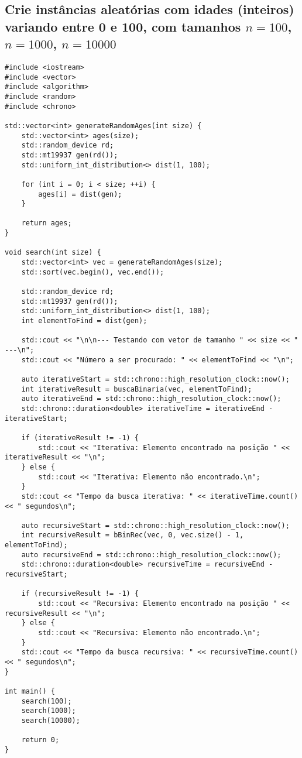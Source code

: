\subsection{Crie instâncias aleatórias com idades (inteiros) variando entre 0 e 100, com tamanhos \( n = 100 \), \( n = 1000 \), \( n = 10000 \)}

\begin{verbatim}
#include <iostream>
#include <vector>
#include <algorithm>
#include <random>
#include <chrono>

std::vector<int> generateRandomAges(int size) {
    std::vector<int> ages(size);
    std::random_device rd;
    std::mt19937 gen(rd());
    std::uniform_int_distribution<> dist(1, 100);

    for (int i = 0; i < size; ++i) {
        ages[i] = dist(gen);
    }

    return ages;
}

void search(int size) {
    std::vector<int> vec = generateRandomAges(size);
    std::sort(vec.begin(), vec.end());

    std::random_device rd;
    std::mt19937 gen(rd());
    std::uniform_int_distribution<> dist(1, 100);
    int elementToFind = dist(gen);

    std::cout << "\n\n--- Testando com vetor de tamanho " << size << " ---\n";
    std::cout << "Número a ser procurado: " << elementToFind << "\n";

    auto iterativeStart = std::chrono::high_resolution_clock::now();
    int iterativeResult = buscaBinaria(vec, elementToFind);
    auto iterativeEnd = std::chrono::high_resolution_clock::now();
    std::chrono::duration<double> iterativeTime = iterativeEnd - iterativeStart;

    if (iterativeResult != -1) {
        std::cout << "Iterativa: Elemento encontrado na posição " << iterativeResult << "\n";
    } else {
        std::cout << "Iterativa: Elemento não encontrado.\n";
    }
    std::cout << "Tempo da busca iterativa: " << iterativeTime.count() << " segundos\n";

    auto recursiveStart = std::chrono::high_resolution_clock::now();
    int recursiveResult = bBinRec(vec, 0, vec.size() - 1, elementToFind);
    auto recursiveEnd = std::chrono::high_resolution_clock::now();
    std::chrono::duration<double> recursiveTime = recursiveEnd - recursiveStart;

    if (recursiveResult != -1) {
        std::cout << "Recursiva: Elemento encontrado na posição " << recursiveResult << "\n";
    } else {
        std::cout << "Recursiva: Elemento não encontrado.\n";
    }
    std::cout << "Tempo da busca recursiva: " << recursiveTime.count() << " segundos\n";
}

int main() {
    search(100);    
    search(1000);   
    search(10000);  

    return 0;
}
\end{verbatim}
